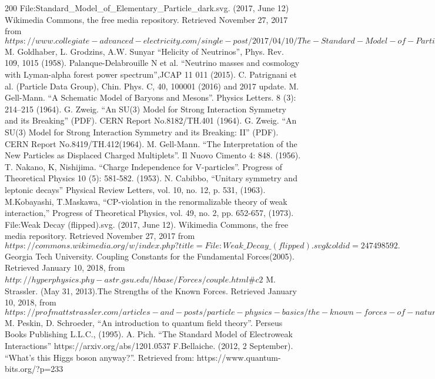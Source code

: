 \documentclass[print]{nuthesis}
\begin{document}
\begin{thebibliography}{200}
 File:Standard\_Model\_of\_Elementary\_Particle\_dark.svg. (2017, June 12) Wikimedia Commons, the free media repository. Retrieved November 27, 2017 from $https://www.collegiate-advanced-electricity.com/single-post/2017/04/10/The-Standard-Model-of-Particle-Physics.$
 M. Goldhaber, L. Grodzins, A.W. Sunyar ``Helicity of Neutrinos'', Phys. Rev. 109, 1015 (1958).
 Palanque-Delabrouille N et al. ``Neutrino masses and cosmology with Lyman-alpha forest power spectrum'',JCAP 11 011 (2015).
C. Patrignani et al. (Particle Data Group), Chin. Phys. C, 40, 100001 (2016) and 2017 update.
 M. Gell-Mann. ``A Schematic Model of Baryons and Mesons''. Physics Letters. 8 (3): 214–215 (1964).
 G. Zweig. ``An SU(3) Model for Strong Interaction Symmetry and its Breaking'' (PDF). CERN Report No.8182/TH.401 (1964).
 G. Zweig. ``An SU(3) Model for Strong Interaction Symmetry and its Breaking: II'' (PDF). CERN Report No.8419/TH.412(1964).
 M. Gell-Mann. ``The Interpretation of the New Particles as Displaced Charged Multiplets''. Il Nuovo Cimento 4: 848. (1956).
 T. Nakano, K, Nishijima. ``Charge Independence for V-particles''. Progress of Theoretical Physics 10 (5): 581-582. (1953).  
 N. Cabibbo, ``Unitary symmetry and leptonic decays'' Physical Review Letters, vol. 10, no. 12, p. 531, (1963).
 M.Kobayashi, T.Maskawa, ``CP-violation in the renormalizable theory of weak interaction,'' Progress of Theoretical Physics, vol. 49, no. 2, pp. 652-657, (1973).
 File:Weak Decay (flipped).svg. (2017, June 12). Wikimedia Commons, the free media repository. Retrieved November 27, 2017 from $https://commons.wikimedia.org/w/index.php?title=File:Weak\_Decay\_(flipped).svg\&oldid=247498592.$
Georgia Tech University. Coupling Constants for the Fundamental Forces(2005). Retrieved January 10, 2018, from $http://hyperphysics.phy-astr.gsu.edu/hbase/Forces/couple.html\#c2$
 M. Strassler. (May 31, 2013).The Strengths of the Known Forces. Retrieved January 10, 2018, from $https://profmattstrassler.com/articles-and-posts/particle-physics-basics/the-known-forces-of-nature/the-strength-of-the-known-forces/$
 M. Peskin, D. Schroeder, ``An introduction to quantum field theory''. Perseus Books Publishing L.L.C., (1995).
 A. Pich. ``The Standard Model of Electroweak Interactions'' https://arxiv.org/abs/1201.0537
 F.Bellaiche. (2012, 2 September). ``What's this Higgs boson anyway?''. Retrieved from: https://www.quantum-bits.org/?p=233 

\end{thebibliography}
\end{document}
